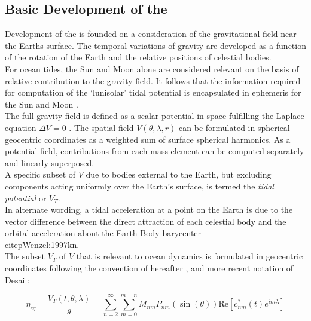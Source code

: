 \subsection{Basic Development of the \ATGP{}}  \label{S:basic_potential}

Development of the \ATGP{} is founded on a consideration of the gravitational field near the Earths surface. The temporal variations of gravity are developed as a function of the rotation of the Earth and the relative positions of celestial bodies.\\
For ocean tides, the Sun and Moon alone are considered relevant on the basis of relative contribution to the gravity field. It follows that the information required for computation of the `lunisolar' tidal potential is encapsulated in ephemeris for the Sun and Moon \citep{Agnew:2011ub}.\\



The full gravity field is defined as a scalar potential in space fulfilling the Laplace equation $\Delta V=0$ \citep[sec 5.3.1]{Urban:2013vl}.  The spatial field $V(\theta,\lambda,r)$ can be formulated in spherical geocentric coordinates as a weighted sum of surface spherical harmonics. As a potential field, contributions from each mass element can be computed separately and linearly superposed.\\
A specific subset of $V$ due to bodies external to the Earth, but excluding components acting uniformly over the Earth's surface, is termed the \emph{tidal potential} \ATGP{} or $V_T$.\\
In alternate wording, a tidal acceleration at a point on the Earth is due to the vector difference between the direct attraction of each celestial body and the orbital acceleration about the Earth-Body barycenter\\citep{Wenzel:1997kn}.\\

The subset $V_T$ of $V$ that is relevant to ocean dynamics is formulated in geocentric coordinates following the convention of \cite{Cartwright:1973em} hereafter \CTE{}, and more recent notation of Desai \cite{Desai:2006wo}:

\begin{equation}
\label{E:VT}
\eta_{eq} = \frac{V_T(t,\theta,\lambda) }{g} = \sum_{n=2}^{\infty} \sum_{m=0}^{m=n} M_{nm} P_{nm}( \sin(\theta) ) \text{Re} \left [ c^{*}_{nm}(t) e^{im\lambda} \right ]
\end{equation}

